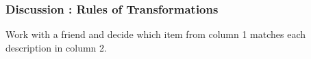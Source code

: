     \addtocounter{footnote}{-0}
    
          \par 
\label{m39358*secfhsst!!!underscore!!!id2730}
            \subsubsection{  Discussion : Rules of Transformations }
            \nopagebreak
            
          \label{m39358*id72588}Work with a friend and decide which item from column 1 matches each description in column 2.\par 
          
    
      
    
    \setlength\mytablespace{4\tabcolsep}
    \addtolength\mytablespace{3\arrayrulewidth}
    \setlength\mytablewidth{\linewidth}
        
    
    \setlength\mytableroom{\mytablewidth}
    \addtolength\mytableroom{-\mytablespace}
    
    \setlength\myfixedwidth{0pt}
    \setlength\mystarwidth{\mytableroom}
        \addtolength\mystarwidth{-\myfixedwidth}
        \divide{}
        

